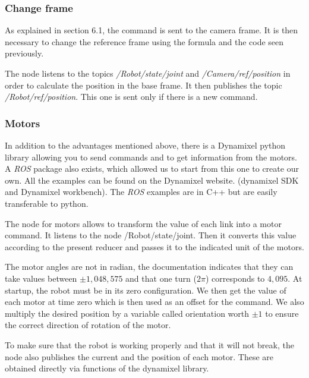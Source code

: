 \subsubsection{Change frame}

As explained in section 6.1, the command is sent to the camera frame. It is then necessary to change the reference frame using the formula and the code seen previously. 

\bigbreak
The node listens to the topics \textit{/Robot/state/joint} and \textit{/Camera/ref/position} in order to calculate the position in the base frame. It then publishes the topic \textit{/Robot/ref/position}. This one is sent only if there is a new command.

\subsubsection{Motors}

In addition to the advantages mentioned above, there is a Dynamixel python library allowing you to send commands and to get information from the motors. A \textit{ROS} package also exists, which allowed us to start from this one to create our own. All the examples can be found on the Dynamixel website. (dynamixel SDK and Dynamixel workbench). The \textit{ROS} examples are in C++ but are easily transferable to python.

\bigbreak
The node for motors allows to transform the value of each link into a motor command. It listens to the node /Robot/state/joint. Then it converts this value according to the present reducer and passes it to the indicated unit of the motors.

\bigbreak
The motor angles are not in radian, the documentation indicates that they can take values between $\pm1,048,575$ and that one turn ($2\pi$) corresponds to $4,095$. At startup, the robot must be in its zero configuration. We then get the value of each motor at time zero which is then used as an offset for the command. We also multiply the desired position by a variable called orientation worth $\pm1$ to ensure the correct direction of rotation of the motor.

\bigbreak
To make sure that the robot is working properly and that it will not break, the node also publishes the current and the position of each motor. These are obtained directly via functions of the dynamixel library.

